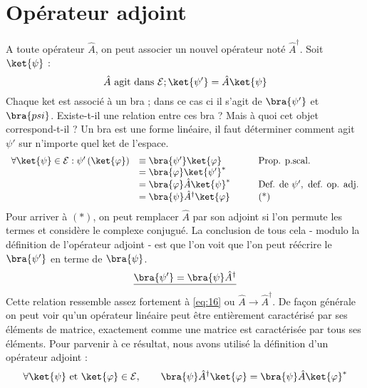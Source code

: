 \section{Opérateur adjoint}
A toute opérateur $\hat{A}$, on peut associer un nouvel opérateur noté $\hat{A}^\dagger$. 
Soit $\ket{\psi}$ :
\begin{equation}
\hat{A} \text{ agit dans }\mathcal{E} ; \ket{\psi'} = \hat{A}\ket{\psi}
\label{eq:16}
\end{equation}
Chaque ket est associé à un bra ; dans ce cas ci il s'agit de $\bra{\psi'}$ et
$\bra{psi}$. Existe-t-il une relation entre ces bra ? Mais à quoi cet objet 
correspond-t-il ? Un bra est une forme linéaire, il faut déterminer comment 
agit $\psi'$ sur n'importe quel ket de l'espace.
\begin{equation}
\begin{array}{lll}
\forall \ket{\psi} \in \mathcal{E} : \psi'\left(\ket{\varphi}\right) &\equiv 
\bra{\psi'}\ket{\varphi} & \qquad \text{Prop. p.scal.}\\
&= \bra{\varphi}\ket{\psi'}^*\\
&= \bra{\varphi}\hat{A}\ket{\psi}^* & \qquad \text{Def. de }\psi', \text{ def. op. adj.}\\
&= \bra{\psi}\hat{A}^\dagger\ket{\varphi}& \qquad \text{(*)}
\end{array}
\end{equation}
Pour arriver à $(*)$, on peut remplacer $\hat{A}$ par son adjoint si l'on 
permute les termes et considère le complexe conjugué.
La conclusion de tous cela - modulo la définition de l'opérateur adjoint - est 
que l'on voit que l'on peut réécrire le $\bra{\psi'}$ en terme de $\bra{\psi}$.
\begin{equation}
\underline{\bra{\psi'} = \bra{\psi}\hat{A}^\dagger}
\end{equation}
Cette relation ressemble assez fortement à \autoref{eq:16} ou $\hat{A}\rightarrow
\hat{A}^\dagger$.
De façon générale on peut voir qu'un opérateur linéaire peut être entièrement 
caractérisé par ses éléments de matrice, exactement comme une matrice est 
caractérisée par tous ses éléments. Pour parvenir à ce résultat, nous avons 
utilisé la définition d'un opérateur adjoint :
\begin{equation}
\forall \ket{\psi} \text{ et } \ket{\varphi} \in \mathcal{E},\qquad 
\bra{\psi}\hat{A}^\dagger \ket{\varphi} = \bra{\psi}\hat{A}\ket{\varphi}^*
\end{equation}

